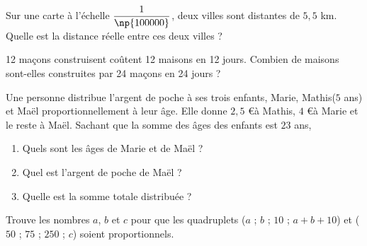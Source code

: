 \begin{pageParcourst}




Sur une carte à l'échelle $\dfrac{1}{\np{100000}}$, deux villes sont distantes de $5,5$ km. Quelle est la distance réelle entre ces deux villes ?




 
  12 maçons construisent coûtent 12 maisons en 12 jours. Combien de maisons sont-elles construites par 24 maçons en 24 jours ?


 
Une personne distribue l'argent de poche à ses trois enfants, Marie, Mathis($5$ ans) et Maël 
proportionnellement à leur âge. Elle donne $2,5$ \euro à Mathis, $4$ \euro  à Marie et le reste à Maël. 
Sachant que la somme des âges des enfants est $23$ ans, 
\begin{enumerate}[leftmargin=*]
\item Quels sont les âges de Marie et de Maël ? 
\item Quel est l'argent de poche de Maël ? 
\item Quelle est la somme totale distribuée ?
\end{enumerate}

 
Trouve les nombres $a$, $b$ et $c$ pour que les quadruplets ($a$ ; $b$ ; $10$ ; $a+b+10$) et ($50$ ; $75$ ; $250$ ; $c$) soient proportionnels.



\end{pageParcourst}
